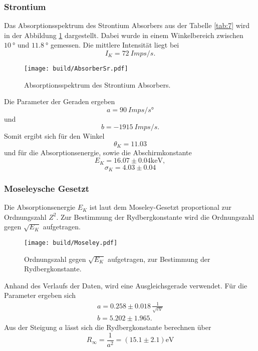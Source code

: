 \subsubsection{Strontium}
Das Absorptionsspektrum des Strontium Absorbers aus der Tabelle \ref{tab:7} wird in der Abbildung \ref{fig:AbSr} dargestellt.
Dabei wurde in einem Winkelbereich zwischen $\qty{10}{°}$ und $\qty{11.8}{°}$ gemessen.
Die mittlere Intensität liegt bei 
\begin{equation*}
    I_K = \qty{72}{Imps/s}.
\end{equation*}
\begin{figure}[H]
    \centering
    \texttt{[image: build/AbsorberSr.pdf]}    
    \caption{Absorptionsspektrum des Strontium Absorbers.}
    \label{fig:AbSr}
\end{figure}
Die Parameter der Geraden ergeben 
\begin{equation*}
    a = \qty{90}{Imps/s°}
\end{equation*}
und
\begin{equation*}
    b = \qty{-1915}{Imps/s}.
\end{equation*}
Somit ergibt sich für den Winkel
\begin{equation*}
    \theta_K = 11.03
\end{equation*}
und für die Absorptionsenergie, sowie die Abschirmkonstante
\begin{equation*}
   E_K = 16.07 \pm 0.04 \unit{\kilo\electronvolt}, 
\end{equation*}
\begin{equation*}
    \sigma_K = 4.03 \pm 0.04
\end{equation*}

\subsubsection{Moseleysche Gesetzt}
Die Absorptionsenergie $E_K$ ist laut dem Moseley-Gesetzt proportional zur Ordnungszahl $Z^2$.
Zur Bestimmung der Rydbergkonstante wird die Ordnungszahl gegen $\sqrt{E_K}$ aufgetragen.

\begin{figure}[H]
    \centering
    \texttt{[image: build/Moseley.pdf]}
    \caption{Ordnungszahl gegen $\sqrt{E_K}$ aufgetragen, zur Bestimmung der Rydbergkonstante.}
    \label{fig:Mos}
\end{figure}
\noindent Anhand des Verlaufs der Daten, wird eine Ausgleichsgerade verwendet.
Für die Parameter ergeben sich 
\begin{align*}
    a = 0.258 \pm 0.018 \, \frac{1}{\sqrt{eV}} \\
    b = 5.202 \pm 1.965.
\end{align*} 
Aus der Steigung $a$ lässt sich die Rydbergkonstante berechnen über
\begin{equation*}
    R_\infty = \frac{1}{a^2} = (15.1 \pm 2.1) \unit{\electronvolt}
\end{equation*}
